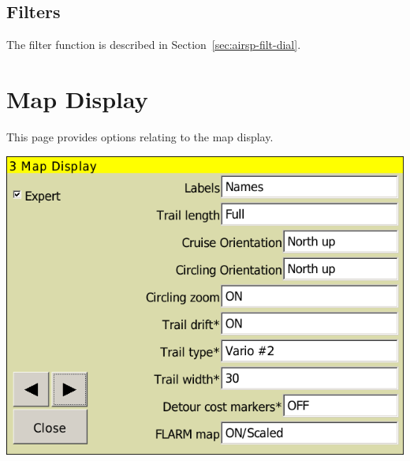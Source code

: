 \documentclass[a4paper,12pt]{refrep}
\begin{document}
\subsection*{Filters}
The filter function is described in Section~\ref{sec:airsp-filt-dial}.




\clearpage
\section{Map Display}\label{sec:map-display}

This page provides options relating to the map display.

\begin{center}
\includegraphics[angle=0,width=\linewidth,keepaspectratio='true']{figures/config-map.png}
\end{center}
\end{document}
